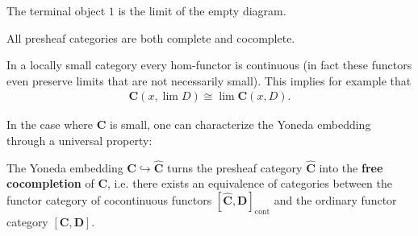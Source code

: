     \begin{example}
        The terminal object $1$ is the limit of the empty diagram.
    \end{example}

    \begin{example}\label{cat:complete_presheaf_category}
        All presheaf categories are both complete and cocomplete.
    \end{example}

    \begin{example}
        In a locally small category every hom-functor is continuous (in fact these functors even preserve limits that are not necessarily small). This implies for example that
        \begin{gather}
            \mathbf{C}(x,\lim D)\cong\lim\mathbf{C}(x, D).
        \end{gather}
    \end{example}

    In the case where $\mathbf{C}$ is small, one can characterize the Yoneda embedding through a universal property:
    \begin{uproperty}\label{cat:free_cocompletion}
        The Yoneda embedding $\mathbf{C}\hookrightarrow\widehat{\mathbf{C}}$ turns the presheaf category $\widehat{\mathbf{C}}$ into the \textbf{free cocompletion} of $\mathbf{C}$, i.e. there exists an equivalence of categories between the functor category of cocontinuous functors $[\widehat{\mathbf{C}},\mathbf{D}]_{\text{cont}}$ and the ordinary functor category $[\mathbf{C},\mathbf{D}]$.
    \end{uproperty}

